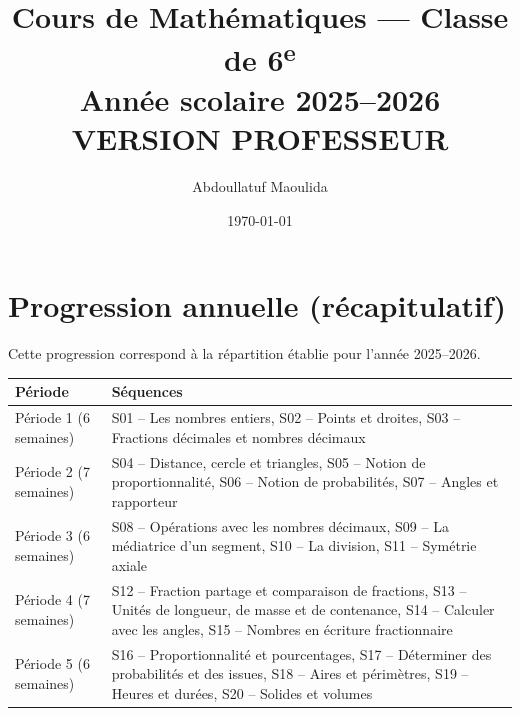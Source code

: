 \documentclass[12pt,a4paper]{book}
\title{Cours de Mathématiques — Classe de 6\textsuperscript{e}\\[0.4em]\large Année scolaire 2025–2026\\[0.2em]\textcolor{mainBlue}{\normalsize VERSION PROFESSEUR}}
\author{Abdoullatuf Maoulida}
\date{\today}
\begin{document}
\VersionCorrige
\maketitle
\tableofcontents
\cleardoublepage


\cleardoublepage
\appendix
\chapter{Progression annuelle (récapitulatif)}
Cette progression correspond à la répartition établie pour l'année 2025–2026.

\begin{center}
\begin{tabular}{|l|l|}
\hline
\textbf{Période} & \textbf{Séquences}\\ \hline
Période 1 (6 semaines) & S01 -- Les nombres entiers, S02 -- Points et droites, S03 -- Fractions décimales et nombres décimaux\\ \hline
Période 2 (7 semaines) & S04 -- Distance, cercle et triangles, S05 -- Notion de proportionnalité, S06 -- Notion de probabilités, S07 -- Angles et rapporteur\\ \hline
Période 3 (6 semaines) & S08 -- Opérations avec les nombres décimaux, S09 -- La médiatrice d'un segment, S10 -- La division, S11 -- Symétrie axiale\\ \hline
Période 4 (7 semaines) & S12 -- Fraction partage et comparaison de fractions, S13 -- Unités de longueur, de masse et de contenance, S14 -- Calculer avec les angles, S15 -- Nombres en écriture fractionnaire\\ \hline
Période 5 (6 semaines) & S16 -- Proportionnalité et pourcentages, S17 -- Déterminer des probabilités et des issues, S18 -- Aires et périmètres, S19 -- Heures et durées, S20 -- Solides et volumes\\ \hline
\end{tabular}
\end{center}
\end{document}

